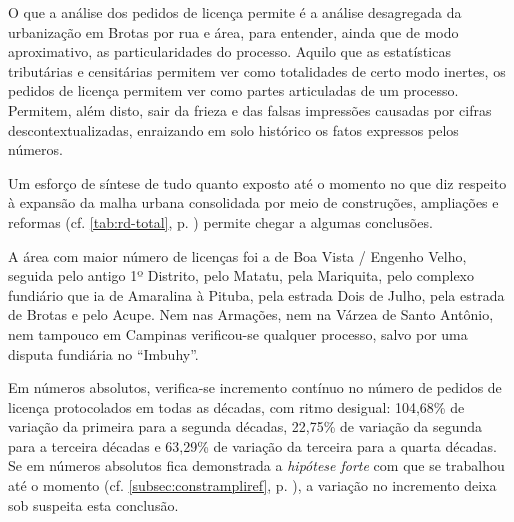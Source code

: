 O que a análise dos pedidos de licença permite é a análise desagregada da urbanização em Brotas por rua e área, para entender, ainda que de modo aproximativo, as particularidades do processo. Aquilo que as estatísticas tributárias e censitárias permitem ver como totalidades de certo modo inertes, os pedidos de licença permitem ver como partes articuladas de um processo. Permitem, além disto, sair da frieza e das falsas impressões causadas por cifras descontextualizadas, enraizando em solo histórico os fatos expressos pelos números.

Um esforço de síntese de tudo quanto exposto até o momento no que diz respeito à expansão da malha urbana consolidada por meio de construções, ampliações e reformas (cf. \autoref{tab:rd-total}, p. \pageref{tab:rd-total}) permite chegar a algumas conclusões.



A área com maior número de licenças foi a de Boa Vista / Engenho Velho, seguida pelo antigo 1º Distrito, pelo Matatu, pela Mariquita, pelo complexo fundiário que ia de Amaralina à Pituba, pela estrada Dois de Julho, pela estrada de Brotas e pelo Acupe. Nem nas Armações, nem na Várzea de Santo Antônio, nem tampouco em Campinas verificou-se qualquer processo, salvo por uma disputa fundiária no ``Imbuhy''.

Em números absolutos, verifica-se incremento contínuo no número de pedidos de licença protocolados em todas as décadas, com ritmo desigual: 104,68\% de variação da primeira para a segunda décadas, 22,75\% de variação da segunda para a terceira décadas e 63,29\% de variação da terceira para a quarta décadas. Se em números absolutos fica demonstrada a \textit{hipótese forte} com que se trabalhou até o momento (cf. \autoref{subsec:constrampliref}, p. \pageref{subsec:constrampliref}), a variação no incremento deixa sob suspeita esta conclusão.

